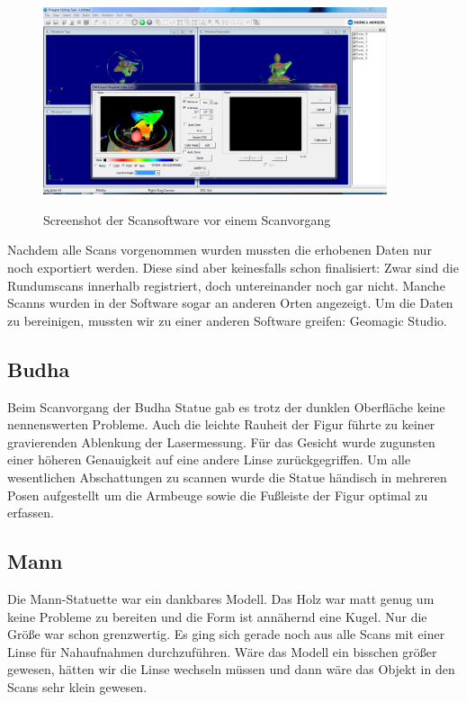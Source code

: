 \documentclass[]{article}
\begin{document}
\begin{figure}[!h]
\caption{Screenshot der Scansoftware vor einem Scanvorgang}
\centering
\includegraphics[width=0.9\textwidth]{images/Statue_Liegend.PNG}
\label{fig:scansoftware}
\end{figure}

Nachdem alle Scans vorgenommen wurden mussten die erhobenen Daten nur noch exportiert werden. Diese sind aber keinesfalls schon finalisiert: Zwar sind die Rundumscans innerhalb registriert, doch untereinander noch gar nicht. Manche Scanns wurden in der Software sogar an anderen Orten angezeigt. Um die Daten zu bereinigen, mussten wir zu einer anderen Software greifen: Geomagic Studio.

\subsection{Budha}

Beim Scanvorgang der Budha Statue gab es trotz der dunklen Oberfläche keine nennenswerten Probleme. Auch die leichte Rauheit der Figur führte zu keiner gravierenden Ablenkung der Lasermessung. Für das Gesicht wurde zugunsten einer höheren Genauigkeit auf eine andere Linse zurückgegriffen. Um alle wesentlichen Abschattungen zu scannen wurde die Statue händisch in mehreren Posen aufgestellt um die Armbeuge sowie die Fußleiste der Figur optimal zu erfassen.


\subsection{Mann}
Die Mann-Statuette war ein dankbares Modell. Das Holz war matt genug um keine Probleme zu bereiten und die Form ist annähernd eine Kugel. Nur die Größe war schon grenzwertig. Es ging sich gerade noch aus alle Scans mit einer Linse für Nahaufnahmen durchzuführen. Wäre das Modell ein bisschen größer gewesen, hätten wir die Linse wechseln müssen und dann wäre das Objekt in den Scans sehr klein gewesen.
\end{document}
